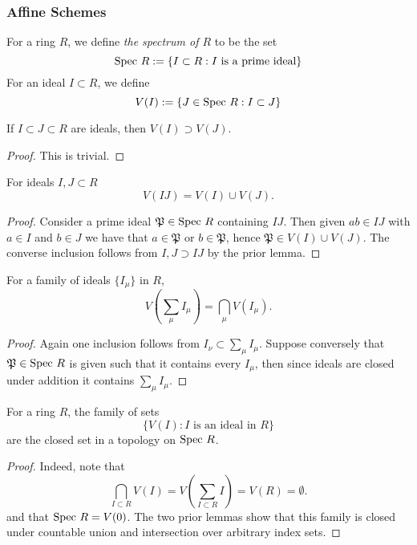 \subsubsection{Affine Schemes}
\begin{definition}
    For a ring $R$, we define \emph{the spectrum of $R$} to be the set
    $$
        \mathrm{Spec}\ R := \{ I \subset R : I \text{ is a prime ideal}\}
    $$
    For an ideal $I\subset R$, we define 
    $$
        V(I) := \{ J\in \mathrm{Spec} \ R : I\subset J\}
    $$
\end{definition}
\begin{lemma}
    If $I\subset J\subset R$ are ideals, then $V(I)\supset V(J)$.
\end{lemma}
\begin{proof}
    This is trivial. 
\end{proof}
\begin{lemma}
    For ideals $I,J\subset R$
    $$V(IJ) = V(I)\cup V(J).$$
\end{lemma}
\begin{proof}
    Consider a prime ideal $\mathfrak{P}\in \mathrm{Spec} \ R$ containing $IJ$. Then given $ab\in IJ$ with $a\in I$ and $b\in J$ we have that $a \in \mathfrak{P}$ or $b\in \mathfrak{P}$, hence $\mathfrak{P}\in V(I)\cup V(J)$. The converse inclusion follows from $I,J\supset IJ$ by the prior lemma. 
\end{proof}
\begin{lemma}
    For a family of ideals $\{I_\mu\}$ in $R$, 
    $$V(\sum_\mu I_\mu) = \bigcap_\mu V(I_\mu).$$ 
\end{lemma}
\begin{proof}
    Again one inclusion follows from $I_\nu\subset \sum_\mu I_\mu$. Suppose conversely that $\mathfrak{P}\in \mathrm{Spec} \ R$ is given such that it contains every $I_\mu$, then since ideals are closed under addition it contains $\sum_\mu I_\mu$.  
\end{proof}
\begin{proposition}
    For a ring $R$, the family of sets 
    $$
        \{V(I) : I \text{ is an ideal in } R\}
    $$
    are the closed set in a topology on $\Spec \ R$. 
\end{proposition}
\begin{proof}
    Indeed, note that 
    $$\bigcap_{I\subset R} V(I) = V\left(\sum_{I\subset R} I\right)= V(R) = \emptyset.$$
    and that $\mathrm{Spec}\ R = V(0)$. The two prior lemmas show that this family is closed under countable union and intersection over arbitrary index sets. 
\end{proof}
